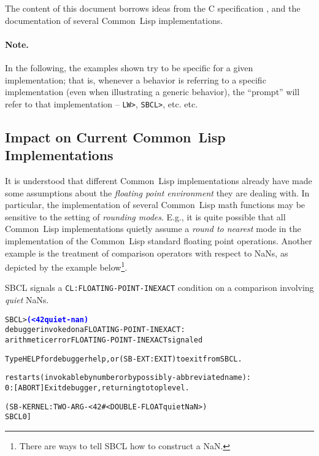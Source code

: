 \documentclass[10pt,fleqn]{article}
\newcommand{\CL}{\textsf{Common~Lisp}}
\newcommand{\CLang}{\textsf{C}}
\newcommand{\code}[1]{\texttt{#1}}
\newcommand{\codeprompt}[1]{\textcolor{blue}{\textbf{#1}}}
\begin{document}
\vspace*{3mm}

The content of this document borrows ideas from the \CLang{}
specification \cite{2018:C18}, and the documentation of
several \CL{} implementations.

\paragraph{Note.} In the following, the examples shown try to be
specific for a given implementation; that is, whenever a behavior is
referring to a specific implementation (even when illustrating a
generic behavior), the ``prompt'' will refer to that implementation --
\code{LW>}, \code{SBCL>}, etc. etc.


\subsection{Impact on Current \CL{} Implementations}

It is understood that different \CL{} implementations already have
made some assumptions about the \emph{floating point environment} they
are dealing with.  In particular, the implementation of several \CL{}
math functions may be sensitive to the
setting of \emph{rounding modes}.  E.g., it is quite possible that all
\CL{} implementations quietly assume a \emph{round to nearest} mode in
the implementation of the \CL{} standard floating point operations.
Another example is the treatment of comparison operators with respect
to NaNs, as depicted by the example below\footnote{There are ways to
  tell SBCL how to construct a NaN.}.

\vspace*{3mm}

\noindent
SBCL signals a \code{CL:FLOATING-POINT-INEXACT} condition on a
comparison involving \emph{quiet} NaNs.
\begin{alltt}
SBCL> \codeprompt{(< 42 quiet-nan)}
debugger invoked on a FLOATING-POINT-INEXACT:
  arithmetic error FLOATING-POINT-INEXACT signaled

Type HELP for debugger help, or (SB-EXT:EXIT) to exit from SBCL.

restarts (invokable by number or by possibly-abbreviated name):
  0: [ABORT] Exit debugger, returning to top level.

(SB-KERNEL:TWO-ARG-< 42 #<DOUBLE-FLOAT quiet NaN>)
SBCL 0]
\end{alltt}

\vspace*{3mm}
\end{document}
